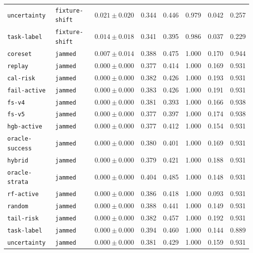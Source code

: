 \documentclass{article}
\begin{document}
\begin{center}
\begin{tabular}{llcccccc}
\texttt{uncertainty} & \texttt{fixture-shift} & $0.021 \pm 0.020$ & 0.344 & 0.446 & 0.979 & 0.042 & 0.257 \\
\texttt{task-label} & \texttt{fixture-shift} & $0.014 \pm 0.018$ & 0.341 & 0.395 & 0.986 & 0.037 & 0.229 \\
\texttt{coreset} & \texttt{jammed} & $0.007 \pm 0.014$ & 0.388 & 0.475 & 1.000 & 0.170 & 0.944 \\
\texttt{replay} & \texttt{jammed} & $0.000 \pm 0.000$ & 0.377 & 0.414 & 1.000 & 0.169 & 0.931 \\
\texttt{cal-risk} & \texttt{jammed} & $0.000 \pm 0.000$ & 0.382 & 0.426 & 1.000 & 0.193 & 0.931 \\
\texttt{fail-active} & \texttt{jammed} & $0.000 \pm 0.000$ & 0.383 & 0.426 & 1.000 & 0.191 & 0.931 \\
\texttt{fs-v4} & \texttt{jammed} & $0.000 \pm 0.000$ & 0.381 & 0.393 & 1.000 & 0.166 & 0.938 \\
\texttt{fs-v5} & \texttt{jammed} & $0.000 \pm 0.000$ & 0.377 & 0.397 & 1.000 & 0.174 & 0.938 \\
\texttt{hgb-active} & \texttt{jammed} & $0.000 \pm 0.000$ & 0.377 & 0.412 & 1.000 & 0.154 & 0.931 \\
\texttt{oracle-success} & \texttt{jammed} & $0.000 \pm 0.000$ & 0.380 & 0.401 & 1.000 & 0.169 & 0.931 \\
\texttt{hybrid} & \texttt{jammed} & $0.000 \pm 0.000$ & 0.379 & 0.421 & 1.000 & 0.188 & 0.931 \\
\texttt{oracle-strata} & \texttt{jammed} & $0.000 \pm 0.000$ & 0.404 & 0.485 & 1.000 & 0.148 & 0.931 \\
\texttt{rf-active} & \texttt{jammed} & $0.000 \pm 0.000$ & 0.386 & 0.418 & 1.000 & 0.093 & 0.931 \\
\texttt{random} & \texttt{jammed} & $0.000 \pm 0.000$ & 0.388 & 0.441 & 1.000 & 0.149 & 0.931 \\
\texttt{tail-risk} & \texttt{jammed} & $0.000 \pm 0.000$ & 0.382 & 0.457 & 1.000 & 0.192 & 0.931 \\
\texttt{task-label} & \texttt{jammed} & $0.000 \pm 0.000$ & 0.394 & 0.460 & 1.000 & 0.144 & 0.889 \\
\texttt{uncertainty} & \texttt{jammed} & $0.000 \pm 0.000$ & 0.381 & 0.429 & 1.000 & 0.159 & 0.931 \\
\bottomrule
\end{tabular}
\end{center}
\normalsize
\end{document}
